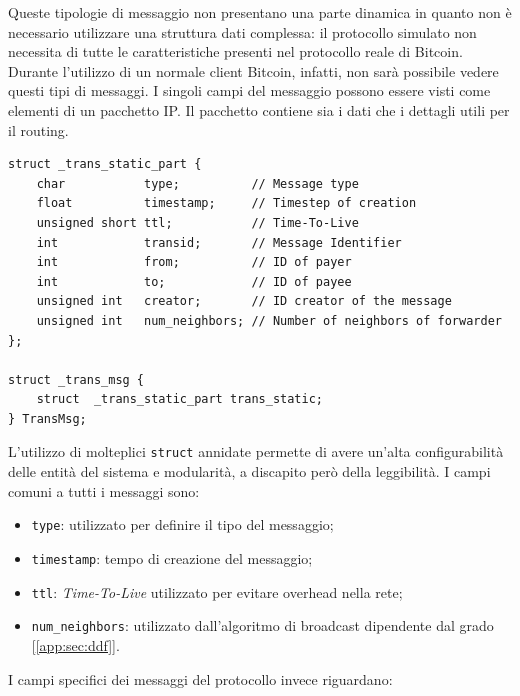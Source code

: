 Queste tipologie di messaggio non presentano una parte dinamica in quanto non è necessario utilizzare una struttura dati complessa: il protocollo simulato non necessita di tutte le caratteristiche presenti nel protocollo reale di Bitcoin. Durante l'utilizzo di un normale client Bitcoin, infatti, non sarà possibile vedere questi tipi di messaggi.\newline
I singoli campi del messaggio possono essere visti come elementi di un pacchetto IP. Il pacchetto contiene sia i dati che i dettagli utili per il routing.
\begin{code}
\begin{verbatim}
struct _trans_static_part {
    char           type;          // Message type
    float          timestamp;     // Timestep of creation
    unsigned short ttl;           // Time-To-Live
    int            transid;       // Message Identifier
    int            from;          // ID of payer
    int            to;            // ID of payee
    unsigned int   creator;       // ID creator of the message
    unsigned int   num_neighbors; // Number of neighbors of forwarder
};

struct _trans_msg {
    struct  _trans_static_part trans_static;
} TransMsg;
\end{verbatim}
\end{code}
L'utilizzo di molteplici \texttt{struct} annidate permette di avere un'alta configurabilità delle entità del sistema e modularità, a discapito però della leggibilità.
I campi comuni a tutti i messaggi sono:
\begin{itemize}
    \item \texttt{type}: utilizzato per definire il tipo del messaggio;
    \item \texttt{timestamp}: tempo di creazione del messaggio;
    \item \texttt{ttl}: \textit{Time-To-Live} utilizzato per evitare overhead nella rete;
    \item \texttt{num\_neighbors}: utilizzato dall'algoritmo di broadcast dipendente dal grado [\ref{app:sec:ddf}].
\end{itemize}
I campi specifici dei messaggi del protocollo invece riguardano:

